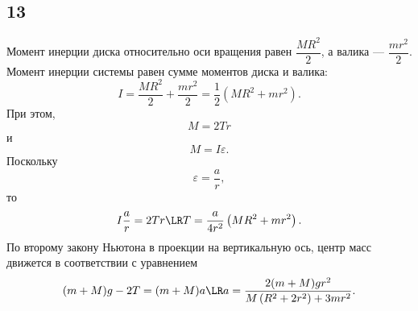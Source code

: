 \subsection{13}

Момент инерции диска относительно оси вращения равен $\dfrac{MR^2}{2}$, а валика --- $\dfrac{mr^2}{2}$. Момент инерции системы равен сумме моментов диска и валика:
\[
I=\frac{MR^2}{2}+\frac{mr^2}{2}=\frac{1}{2}\left(MR^2+mr^2\right).
\]
При этом,
\[
M=2Tr
\]
и
\[
M=I\varepsilon.
\]
Поскольку
\[
\varepsilon=\frac{a}{r},
\]
то
\[
I\frac{a}{r}=2Tr\LR T=\frac{a}{4r^2}\left(MR^2+mr^2\right).
\]
По второму закону Ньютона в проекции на вертикальную ось, центр масс движется в соответствии с уравнением
\[
(m+M)g-2T=(m+M)a\LR a=\frac{2(m+M)gr^2}{M\left(R^2+2r^2\right)+3mr^2}.
\]